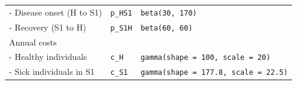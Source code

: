 \documentclass[]{book}
\begin{document}
\begin{longtable}[]{@{}lll@{}}
\begin{minipage}[t]{0.33\columnwidth}
- Disease onset (H to S1)\strut
\end{minipage} & \begin{minipage}[t]{0.13\columnwidth}\raggedright\strut
\texttt{p\_HS1}\strut
\end{minipage} & \begin{minipage}[t]{0.45\columnwidth}\raggedright\strut
\texttt{beta(30,\ 170)}\strut
\end{minipage}\tabularnewline
\begin{minipage}[t]{0.33\columnwidth}\raggedright\strut
- Recovery (S1 to H)\strut
\end{minipage} & \begin{minipage}[t]{0.13\columnwidth}\raggedright\strut
\texttt{p\_S1H}\strut
\end{minipage} & \begin{minipage}[t]{0.45\columnwidth}\raggedright\strut
\texttt{beta(60,\ 60)}\strut
\end{minipage}\tabularnewline
\begin{minipage}[t]{0.33\columnwidth}\raggedright\strut
Annual costs\strut
\end{minipage} & \begin{minipage}[t]{0.13\columnwidth}\raggedright\strut
\strut
\end{minipage} & \begin{minipage}[t]{0.45\columnwidth}\raggedright\strut
\strut
\end{minipage}\tabularnewline
\begin{minipage}[t]{0.33\columnwidth}\raggedright\strut
- Healthy individuals\strut
\end{minipage} & \begin{minipage}[t]{0.13\columnwidth}\raggedright\strut
\texttt{c\_H}\strut
\end{minipage} & \begin{minipage}[t]{0.45\columnwidth}\raggedright\strut
\texttt{gamma(shape\ =\ 100,\ scale\ =\ 20)}\strut
\end{minipage}\tabularnewline
\begin{minipage}[t]{0.33\columnwidth}\raggedright\strut
- Sick individuals in S1\strut
\end{minipage} & \begin{minipage}[t]{0.13\columnwidth}\raggedright\strut
\texttt{c\_S1}\strut
\end{minipage} & \begin{minipage}[t]{0.45\columnwidth}\raggedright\strut
\texttt{gamma(shape\ =\ 177.8,\ scale\ =\ 22.5)}\strut
\end{minipage}\tabularnewline

\end{longtable}
\end{document}
